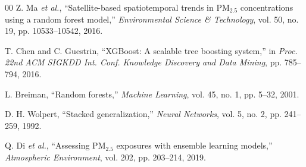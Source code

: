\documentclass[conference]{IEEEtran}
\begin{document}
\begin{thebibliography}{00}
Z. Ma \textit{et al.}, “Satellite-based spatiotemporal trends in PM$_{2.5}$ concentrations using a random forest model,” 
\textit{Environmental Science \& Technology}, vol. 50, no. 19, pp. 10533–10542, 2016.

T. Chen and C. Guestrin, “XGBoost: A scalable tree boosting system,” 
in \textit{Proc. 22nd ACM SIGKDD Int. Conf. Knowledge Discovery and Data Mining}, pp. 785–794, 2016.

L. Breiman, “Random forests,” 
\textit{Machine Learning}, vol. 45, no. 1, pp. 5–32, 2001.

D. H. Wolpert, “Stacked generalization,” 
\textit{Neural Networks}, vol. 5, no. 2, pp. 241–259, 1992.

Q. Di \textit{et al.}, “Assessing PM$_{2.5}$ exposures with ensemble learning models,” 
\textit{Atmospheric Environment}, vol. 202, pp. 203–214, 2019.

\end{thebibliography}

\vspace{12pt}
\color{red}
\end{document}
